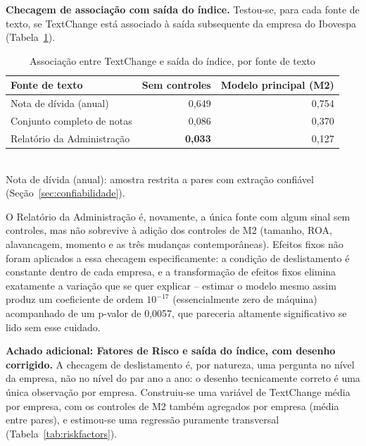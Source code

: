 \documentclass[a4paper,12pt]{report}
\begin{document}
\textbf{Checagem de associação com saída do índice.} Testou-se, para cada fonte de texto, se TextChange está associado à saída subsequente da empresa do Ibovespa (Tabela~\ref{tab:delisting}).

\begin{table}[htbp]
    \centering
    \caption{Associação entre TextChange e saída do índice, por fonte de texto}
    \label{tab:delisting}
    \begin{tabular}{@{}lrr@{}}
        \toprule
        \textbf{Fonte de texto} & \textbf{Sem controles} & \textbf{Modelo principal (M2)} \\
        \midrule
        Nota de dívida (anual)      & 0,649 & 0,754 \\
        Conjunto completo de notas  & 0,086 & 0,370 \\
        Relatório da Administração  & \textbf{0,033} & 0,127 \\
        \bottomrule
    \end{tabular}
    \\[0.3cm]
    {\footnotesize Nota de dívida (anual): amostra restrita a pares com extração confiável (Seção~\ref{sec:confiabilidade}).}
\end{table}

O Relatório da Administração é, novamente, a única fonte com algum sinal sem controles, mas não sobrevive à adição dos controles de M2 (tamanho, ROA, alavancagem, momento e as três mudanças contemporâneas). Efeitos fixos não foram aplicados a essa checagem especificamente: a condição de deslistamento é constante dentro de cada empresa, e a transformação de efeitos fixos elimina exatamente a variação que se quer explicar -- estimar o modelo mesmo assim produz um coeficiente de ordem $10^{-17}$ (essencialmente zero de máquina) acompanhado de um p-valor de 0,0057, que pareceria altamente significativo se lido sem esse cuidado.

\textbf{Achado adicional: Fatores de Risco e saída do índice, com desenho corrigido.} A checagem de deslistamento é, por natureza, uma pergunta no nível da empresa, não no nível do par ano a ano: o desenho tecnicamente correto é uma única observação por empresa. Construiu-se uma variável de TextChange média por empresa, com os controles de M2 também agregados por empresa (média entre pares), e estimou-se uma regressão puramente transversal (Tabela~\ref{tab:riskfactors}).
\end{document}
